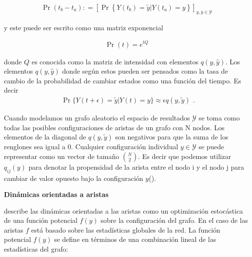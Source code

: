 \begin{equation}
    \begin{align}
        \operatorname { Pr } \left( t _ { b } - t _ { a } \right) : = \left[ \operatorname { Pr } \left\{ Y \left( t _ { b } \right) = \tilde { y } | Y \left( t _ { a } \right) = y \right\} \right] _ { y , \bar { y } \in \mathcal { Y } }
    \end{align}
\end{equation}


y este puede ser escrito como una matriz exponencial

\begin{equation}
    \begin{align}
        \operatorname { Pr } ( t ) = e ^ { t Q }
    \end{align}
\end{equation}

donde $Q$ es conocida como la matriz de intensidad con elementos $q(y, \hat{y})$. Los elementos $q(y, \hat{y})$ donde según \cite{SurveyStats} estos pueden ser pensados como la tasa de cambio de la probabilidad de cambiar estados como una función del tiempo. Es decir \\
$$\begin{array} { l } { \operatorname { Pr } \{ Y ( t + \epsilon ) = \tilde { y } | Y ( t ) = y \} \approx \epsilon q ( y , \tilde { y } ) }\end{array}.$$

Cuando modelamos un grafo aleatorio el espacio de resultados $\mathcal{Y}$ se toma como todas las posibles configuraciones de aristas de un grafo con N nodos. Los elementos de la diagonal de $q ( y , \tilde { y } )$ son negativos para que la suma de los renglones sea igual a 0. Cualquier configuración individual $y \in \mathcal{Y}$ se puede representar como un vector de tamaño $N \choose 2$. Es decir que podemos utilizar $q_{ij}(y)$ para denotar la propensidad de la arista entre el nodo i y el nodo j para cambiar de valor opuesto bajo la configuración $y$(\cite{SurveyStats}).


\textbf{Dinámicas orientadas a aristas}


\cite{Snidjers2002} describe las dinámicas orientadas a las aristas como un optimización estocástica de una función potencial $f(y)$ sobre la configuración del grafo. En el caso de las aristas $f$ está basado sobre las estadísticas globales de la red. La función potencial $f(y)$ se define en términos de una combinación lineal de las estadísticas del grafo:

